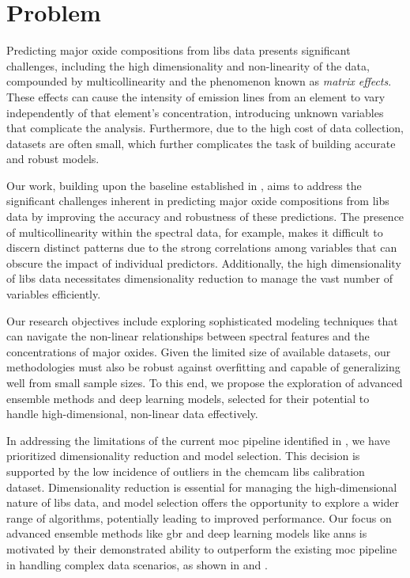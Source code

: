 \section{Problem}
\label{sec:problem_definition}

Predicting major oxide compositions from \gls{libs} data presents significant challenges, including the high dimensionality and non-linearity of the data, compounded by multicollinearity and the phenomenon known as \textit{matrix effects}.
These effects can cause the intensity of emission lines from an element to vary independently of that element's concentration, introducing unknown variables that complicate the analysis.
Furthermore, due to the high cost of data collection, datasets are often small, which further complicates the task of building accurate and robust models.

Our work, building upon the baseline established in \citet{p9_paper}, aims to address the significant challenges inherent in predicting major oxide compositions from \gls{libs} data by improving the accuracy and robustness of these predictions.
The presence of multicollinearity within the spectral data, for example, makes it difficult to discern distinct patterns due to the strong correlations among variables that can obscure the impact of individual predictors.
Additionally, the high dimensionality of \gls{libs} data necessitates dimensionality reduction to manage the vast number of variables efficiently.

Our research objectives include exploring sophisticated modeling techniques that can navigate the non-linear relationships between spectral features and the concentrations of major oxides.
Given the limited size of available datasets, our methodologies must also be robust against overfitting and capable of generalizing well from small sample sizes.
To this end, we propose the exploration of advanced ensemble methods and deep learning models, selected for their potential to handle high-dimensional, non-linear data effectively.

In addressing the limitations of the current \gls{moc} pipeline identified in \citet{p9_paper}, we have prioritized dimensionality reduction and model selection.
This decision is supported by the low incidence of outliers in the \gls{chemcam} \gls{libs} calibration dataset.
Dimensionality reduction is essential for managing the high-dimensional nature of \gls{libs} data, and model selection offers the opportunity to explore a wider range of algorithms, potentially leading to improved performance.
Our focus on advanced ensemble methods like \gls{gbr} and deep learning models like \gls{ann}s is motivated by their demonstrated ability to outperform the existing \gls{moc} pipeline in handling complex data scenarios, as shown in \citet{p9_paper} and \citet{andersonPostlandingMajorElement2022}.


